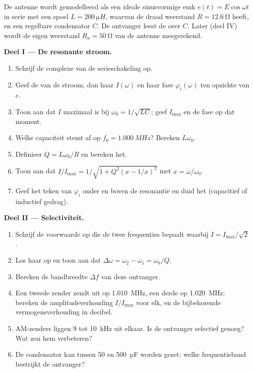 \begin{problem}
\label{pb:b1:sinusoidal-impedance:1}
De antenne wordt gemodelleerd als een ideale sinusvormige emk $e(t) = E\cos\omega t$
in serie met een spoel $L = \qty{200}{\micro H}$, waarvan de draad
weerstand $R = \qty{12.6}{\ohm}$ heeft, en een regelbare condensator $C$. De
ontvanger leest de  over $C$. Later (deel IV) wordt de eigen weerstand
$R_a = \qty{50}{\ohm}$ van de antenne meegerekend.

\medskip
\noindent\textbf{Deel I --- De resonante stroom.}
\begin{enumerate}
  \item Schrijf de complexe  van de serieschakeling op.
  \item Geef de  van de stroom, dan haar 
        $I(\omega)$ en haar fase $\varphi_i(\omega)$ ten opzichte van $e$.
  \item Toon aan dat $I$ maximaal is bij $\omega_0 = 1/\sqrt{LC}$; geef
        $I_{\max}$ en de fase op dat moment.
  \item Welke capaciteit stemt af op $f_0 = \qty{1.000}{MHz}$? Bereken
        $L\omega_0$.
  \item Definieer $Q = L\omega_0/R$ en bereken het.
  \item Toon aan dat $I/I_{\max} = 1/\sqrt{1 + Q^2(x - 1/x)^2}$ met
        $x = \omega/\omega_0$.
  \item Geef het teken van $\varphi_i$ onder en boven de resonantie en
        duid het (capacitief of inductief gedrag).
\end{enumerate}

\medskip
\noindent\textbf{Deel II --- Selectiviteit.}
\begin{enumerate}[resume]
  \item Schrijf de voorwaarde op die de twee frequenties bepaalt waarbij
        $I = I_{\max}/\sqrt2$.
  \item Los haar op en toon aan dat $\Delta\omega = \omega_2 - \omega_1 =
        \omega_0/Q$.
  \item Bereken de bandbreedte $\Delta f$ van deze ontvanger.
  \item Een tweede zender zendt uit op \qty{1.010}{MHz}, een derde op
        \qty{1.020}{MHz}: bereken de amplitudeverhouding $I/I_{\max}$ voor
        elk, en de bijbehorende vermogensverhouding in decibel.
  \item AM-zenders liggen \qty{9}{} tot \qty{10}{kHz} uit elkaar. Is de
        ontvanger selectief genoeg? Wat zou hem verbeteren?
  \item De condensator kan tussen \qty{50}{} en \qty{500}{pF} worden gezet:
        welke frequentieband bestrijkt de ontvanger?
\end{enumerate}


\end{problem}
